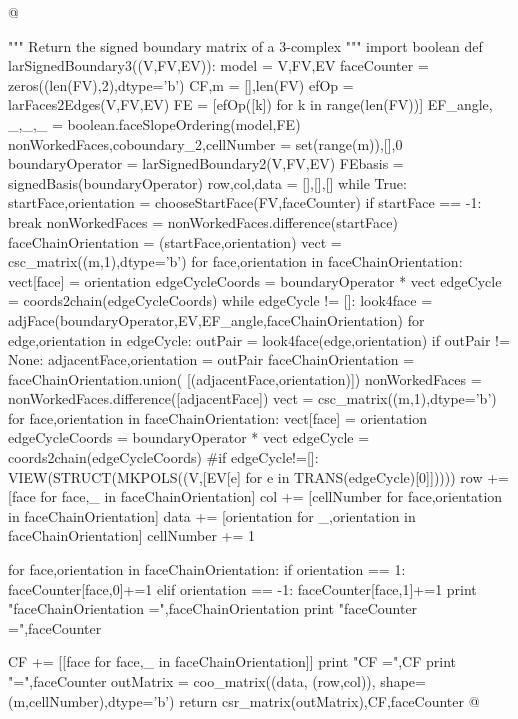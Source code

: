 \documentclass[11pt,oneside]{article}    %
\begin{document}
@{""" Return the signed boundary matrix of a 3-complex """
import boolean
def larSignedBoundary3((V,FV,EV)):
    model = V,FV,EV
    faceCounter = zeros((len(FV),2),dtype='b')
    CF,m = [],len(FV)
    efOp = larFaces2Edges(V,FV,EV)
    FE = [efOp([k]) for k in range(len(FV))]
    EF_angle, _,_,_ = boolean.faceSlopeOrdering(model,FE)
    nonWorkedFaces,coboundary_2,cellNumber = set(range(m)),[],0
    boundaryOperator = larSignedBoundary2(V,FV,EV)
    FEbasis = signedBasis(boundaryOperator)
    row,col,data = [],[],[]
    while True:
        startFace,orientation = chooseStartFace(FV,faceCounter)
        if startFace == -1: break
        nonWorkedFaces = nonWorkedFaces.difference({startFace})
        faceChainOrientation = {(startFace,orientation)}
        vect = csc_matrix((m,1),dtype='b')
        for face,orientation in faceChainOrientation:  
            vect[face] = orientation
        edgeCycleCoords = boundaryOperator * vect
        edgeCycle = coords2chain(edgeCycleCoords)
        while edgeCycle != []:
            look4face = adjFace(boundaryOperator,EV,EF_angle,faceChainOrientation)
            for edge,orientation in edgeCycle:
                outPair = look4face(edge,orientation)
                if outPair != None:
                    adjacentFace,orientation = outPair
                    faceChainOrientation = faceChainOrientation.union(
                        [(adjacentFace,orientation)])
                    nonWorkedFaces = nonWorkedFaces.difference([adjacentFace])
            vect = csc_matrix((m,1),dtype='b')
            for face,orientation in faceChainOrientation:  
                vect[face] = orientation
            edgeCycleCoords = boundaryOperator * vect
            edgeCycle = coords2chain(edgeCycleCoords)
            #if edgeCycle!=[]: VIEW(STRUCT(MKPOLS((V,[EV[e] for e in TRANS(edgeCycle)[0]]))))
        row += [face for face,_ in faceChainOrientation]
        col += [cellNumber for face,orientation in faceChainOrientation]
        data += [orientation for _,orientation in faceChainOrientation]
        cellNumber += 1
        
        for face,orientation in faceChainOrientation:
          if orientation == 1: faceCounter[face,0]+=1
          elif orientation == -1: faceCounter[face,1]+=1
        print "faceChainOrientation =",faceChainOrientation   
        print "faceCounter =",faceCounter   
          
        CF += [[face for face,_ in faceChainOrientation]]
        print "CF =",CF
        print "\nfaceCounter =",faceCounter      
    outMatrix = coo_matrix((data, (row,col)), shape=(m,cellNumber),dtype='b')
    return csr_matrix(outMatrix),CF,faceCounter
@}
\end{document}
